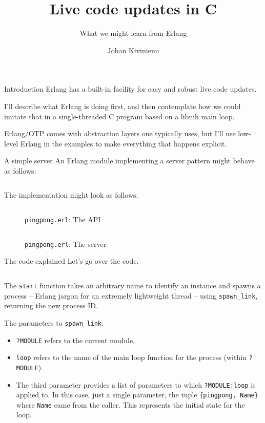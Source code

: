 \documentclass{beamer}
\title{Live code updates in C}
\subtitle{What we might learn from Erlang}
\author{Johan Kiviniemi}
\begin{document}
\begin{frame}[plain]
  \titlepage
\end{frame}

\begin{frame}{Introduction}
  Erlang has a built-in facility for easy and robust live code updates.

  I’ll describe what Erlang is doing first, and then contemplate how we could
  imitate that in a single-threaded C program based on a libnih main loop.

  Erlang/OTP comes with abstraction layers one typically uses, but I’ll use
  low-level Erlang in the examples to make everything that happens explicit.
\end{frame}

\begin{frame}[fragile]{A simple server}
  An Erlang module implementing a server pattern might behave as follows:

  \inputminted{erlang}{pingpong-00-example.erl-sh}
\end{frame}

\begin{frame}[fragile]
  The implementation might look as follows:

  \begin{figure}[H]
    \inputminted[lastline=13]{erlang}{pingpong-00.erl}
    \caption{\texttt{pingpong.erl}: The API}
  \end{figure}
\end{frame}

\begin{frame}[fragile]
  \begin{figure}[H]
    \inputminted[firstline=15]{erlang}{pingpong-00.erl}
    \caption{\texttt{pingpong.erl}: The server}
  \end{figure}
\end{frame}

\begin{frame}[fragile]{The code explained}
  Let’s go over the code.

  \inputminted[firstline=6,lastline=7]{erlang}{pingpong-00.erl}

  The \verb|start| function takes an arbitrary name to identify an instance and
  spawns a process – Erlang jargon for an extremely lightweight thread – using
  \verb|spawn_link|, returning the new process ID.

  The parameters to \verb|spawn_link|:

  \begin{itemize}
    \item \verb|?MODULE| refers to the current module.

    \item \verb|loop| refers to the name of the main loop function for the
    process (within \verb|?MODULE|).

    \item The third parameter provides a list of parameters to which
    \verb|?MODULE:loop| is applied to. In this case, just a single parameter,
    the tuple \verb|{pingpong, Name}| where \verb|Name| came from the caller.
    This represents the initial state for the loop.
  \end{itemize}
\end{frame}
\end{document}
